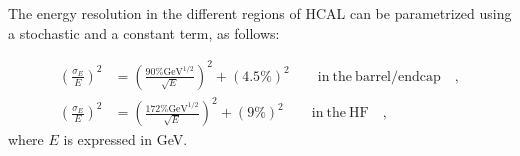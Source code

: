 The energy resolution in the different regions of HCAL can be parametrized using a stochastic and a constant term, as follows:

\begin{equation}
\begin{split}
\left(\frac{\sigma_E}{E}\right)^2 &= \left(\frac{90\% \mathrm{GeV}^{1/2}}{\sqrt{E}}\right)^2 + \left(4.5\%\right)^2 \qquad \mathrm{in~ the~ barrel/endcap}\quad,\\
\left(\frac{\sigma_E}{E}\right)^2 &= \left(\frac{172\% \mathrm{GeV}^{1/2}}{\sqrt{E}}\right)^2 + \left(9\%\right)^2 \qquad \mathrm{in~ the~ HF}\quad,
\end{split}
\end{equation}
where $E$ is expressed in GeV.


